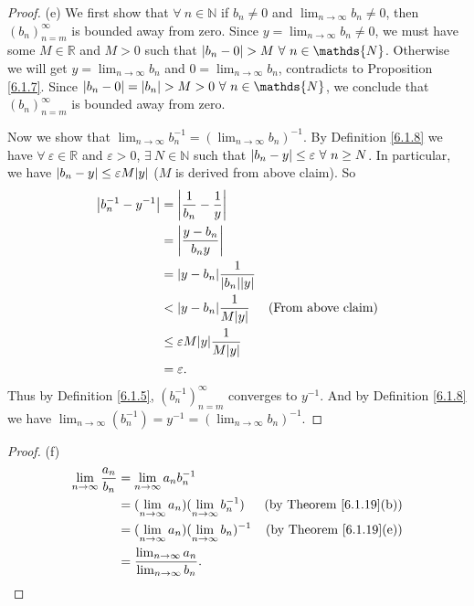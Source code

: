 \begin{proof}{(e)}
We first show that \(\forall\ n \in \mathds{N}\) if \(b_n \neq 0\) and \(\lim_{n \to \infty} b_n \neq 0\), then \((b_n)_{n = m}^\infty\) is bounded away from zero.
Since \(y = \lim_{n \to \infty} b_n \neq 0\), we must have some \(M \in \mathds{R}\) and \(M > 0\) such that \(\abs*{b_n - 0} > M \ \forall\ n \in \mathds{N}\).
Otherwise we will get \(y = \lim_{n \to \infty} b_n\) and \(0 = \lim_{n \to \infty} b_n\), contradicts to Proposition \ref{6.1.7}.
Since \(\abs*{b_n - 0} = \abs*{b_n} > M > 0 \ \forall\ n \in \mathds{N}\), we conclude that \((b_n)_{n = m}^\infty\) is bounded away from zero.

Now we show that \(\lim_{n \to \infty} b_n^{-1} = (\lim_{n \to \infty} b_n)^{-1}\).
By Definition \ref{6.1.8} we have \(\forall\ \varepsilon \in \mathds{R}\) and \(\varepsilon > 0\), \(\exists\ N \in \mathds{N}\) such that \(\abs*{b_n - y} \leq \varepsilon \ \forall\ n \geq N\).
In particular, we have \(\abs*{b_n - y} \leq \varepsilon M\abs*{y}\) (\(M\) is derived from above claim).
So
\begin{align*}
\abs*{b_n^{-1} - y^{-1}} &= \abs*{\frac{1}{b_n} - \frac{1}{y}} \\
&= \abs*{\frac{y - b_n}{b_n y}} \\
&= \abs*{y - b_n}\frac{1}{\abs*{b_n}\abs*{y}} \\
&< \abs*{y - b_n}\frac{1}{M\abs*{y}} & \text{(From above claim)} \\
&\leq \varepsilon M\abs*{y}\frac{1}{M\abs*{y}} \\
&= \varepsilon.
\end{align*}
Thus by Definition \ref{6.1.5}, \((b_n^{-1})_{n = m}^\infty\) converges to \(y^{-1}\).
And by Definition \ref{6.1.8} we have \(\lim_{n \to \infty} (b_n^{-1}) = y^{-1} = (\lim_{n \to \infty} b_n)^{-1}\).
\end{proof}

\begin{proof}{(f)}
\begin{align*}
\lim_{n \to \infty} \frac{a_n}{b_n} &= \lim_{n \to \infty} a_n b_n^{-1} \\
&= (\lim_{n \to \infty} a_n)(\lim_{n \to \infty} b_n^{-1}) & \text{(by Theorem \ref{6.1.19}(b))} \\
&= (\lim_{n \to \infty} a_n)(\lim_{n \to \infty} b_n)^{-1} & \text{(by Theorem \ref{6.1.19}(e))} \\
&= \frac{\lim_{n \to \infty} a_n}{\lim_{n \to \infty} b_n}.
\end{align*}
\end{proof}

